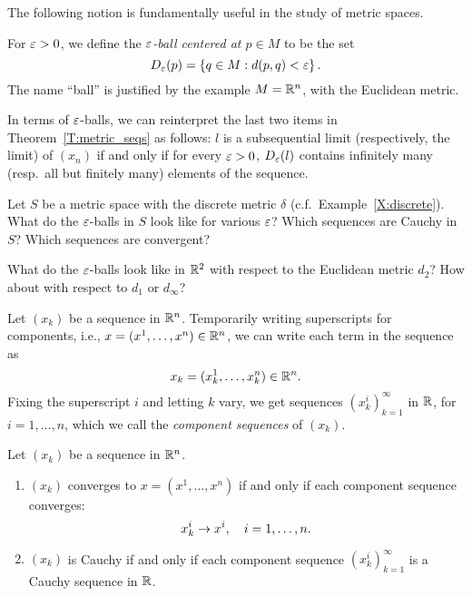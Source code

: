 \documentclass{book}
\begin{document}
The following notion is fundamentally useful in the study of metric spaces.
\begin{defn}
For $\varepsilon > 0$, we define the {\em $\varepsilon$-ball centered at $p \in M$} to be the set
\[
	D_\varepsilon(p) = \left\{ q \in M : d(p,q) < \varepsilon \right\}.
\]
The name ``ball'' is justified by the example $M = \mathbb{R}^n$, with the Euclidean metric.
\label{D:ve_ball}
\end{defn}

\begin{rmk}
In terms of $\varepsilon$-balls, we can reinterpret the last two items in Theorem~\ref{T:metric_seqs} as follows: $l$ is a subsequential limit (respectively, the limit) of 
$(x_n)$ if and only if for every $\varepsilon > 0$, $D_\varepsilon(l)$ contains infinitely many (resp.\ all but finitely many) elements of the sequence.
\end{rmk}

\begin{ex}
Let $S$ be a metric space with the discrete metric $\delta$ (c.f.\
Example~\ref{X:discrete}). What do the $\varepsilon$-balls in $S$ look like for various
$\varepsilon$?  Which sequences are Cauchy in $S$?  Which sequences are convergent?
\label{X:discrete_convergence}
\end{ex}

\begin{ex}
What do the $\varepsilon$-balls look like in $\mathbb{R}^2$ with respect to the Euclidean metric $d_2$? 
How about with respect to $d_1$ or $d_\infty$?
\label{X:balls_in_R^2}
\end{ex}

\begin{defn}
Let $(x_k)$ be a sequence in $\mathbb{R}^n$. Temporarily writing superscripts for
components, i.e., $x = (x^1,\ldots,x^n) \in \mathbb{R}^n$, we can write each term in
the sequence as
\[
	x_k = (x_k^1,\ldots,x_k^n) \in \mathbb{R}^n.
\]
Fixing the superscript $i$ and letting $k$ vary, we get sequences $(x^i_k)_{k=1}^\infty$ in
$\mathbb{R}$, for $i = 1,\ldots, n$, which we call the {\em component sequences} of $(x_k)$. 
\label{D:component_sequences}
\end{defn}

\begin{prop}
Let $(x_k)$ be a sequence in $\mathbb{R}^n$.
\mbox{}
\begin{enumerate}
\item 
$(x_k)$ converges to $x = (x^1,\ldots,x^n)$ if and only if each component sequence converges:
\[
	x^i_k \rightarrow x^i, \quad i = 1,\ldots, n.
\]
\item 
$(x_k)$ is Cauchy if and only if each component sequence $(x^i_k)_{k=1}^\infty$ is a Cauchy sequence in $\mathbb{R}$.
\end{enumerate}
\label{P:Rn_component_seqs}
\end{prop}
\end{document}
